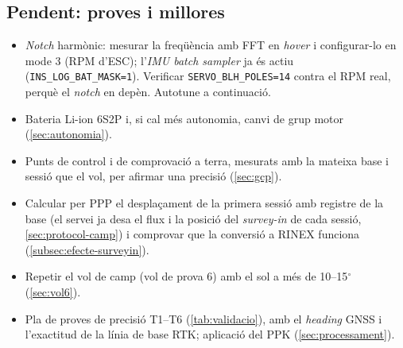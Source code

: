 \subsection{Pendent: proves i millores}
\begin{itemize}
    \item \emph{Notch} harmònic: mesurar la freqüència amb FFT en \emph{hover} i configurar-lo en mode 3 (RPM d'ESC); l'\emph{IMU batch sampler} ja és actiu (\texttt{INS\_LOG\_BAT\_MASK=1}). Verificar \texttt{SERVO\_BLH\_POLES=14} contra el RPM real, perquè el \emph{notch} en depèn. Autotune a continuació.
    \item Bateria Li-ion 6S2P i, si cal més autonomia, canvi de grup motor (\cref{sec:autonomia}).
    \item Punts de control i de comprovació a terra, mesurats amb la mateixa base i sessió que el vol, per afirmar una precisió (\cref{sec:gcp}).
    \item Calcular per PPP el desplaçament de la primera sessió amb registre de la base (el servei ja desa el flux i la posició del \emph{survey-in} de cada sessió, \cref{sec:protocol-camp}) i comprovar que la conversió a RINEX funciona (\cref{subsec:efecte-surveyin}).
    \item Repetir el vol de camp (vol de prova 6) amb el sol a més de 10--15$^{\circ}$ (\cref{sec:vol6}).
    \item Pla de proves de precisió T1--T6 (\cref{tab:validacio}), amb el \emph{heading} GNSS i l'exactitud de la línia de base RTK; aplicació del PPK (\cref{sec:processament}).
\end{itemize}
